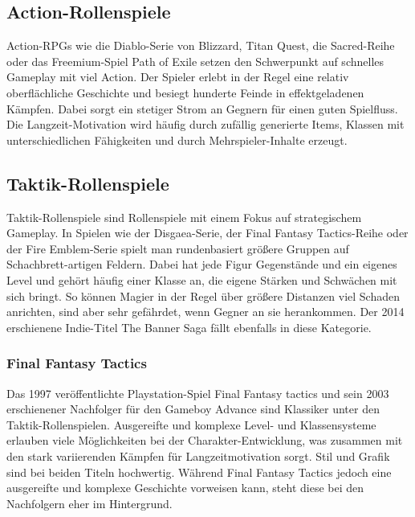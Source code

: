 \documentclass[extern,palatino]{cgBA}
\begin{document}
	\subsection{Action-Rollenspiele}
	Action-RPGs wie die Diablo-Serie von Blizzard, Titan Quest, die Sacred-Reihe oder das Freemium-Spiel Path of Exile setzen den Schwerpunkt auf schnelles Gameplay mit viel Action. Der Spieler erlebt in der Regel eine relativ oberflächliche Geschichte und besiegt hunderte Feinde in effektgeladenen Kämpfen. Dabei sorgt ein stetiger Strom an Gegnern für einen guten Spielfluss. Die Langzeit-Motivation wird häufig durch zufällig generierte Items, Klassen mit unterschiedlichen Fähigkeiten und durch Mehrspieler-Inhalte erzeugt.
	\subsection{Taktik-Rollenspiele}
	Taktik-Rollenspiele sind Rollenspiele mit einem Fokus auf strategischem Gameplay. In Spielen wie der Disgaea-Serie, der Final Fantasy Tactics-Reihe oder der Fire Emblem-Serie spielt man rundenbasiert größere Gruppen auf Schachbrett-artigen Feldern. Dabei hat jede Figur Gegenstände und ein eigenes Level und gehört häufig einer Klasse an, die eigene Stärken und Schwächen mit sich bringt. So können Magier in der Regel über größere Distanzen viel Schaden anrichten, sind aber sehr gefährdet, wenn Gegner an sie herankommen. Der 2014 erschienene Indie-Titel The Banner Saga fällt ebenfalls in diese Kategorie.
	\subsubsection{Final Fantasy Tactics}
	Das 1997 veröffentlichte Playstation-Spiel Final Fantasy tactics und sein 2003 erschienener Nachfolger für den Gameboy Advance sind Klassiker unter den Taktik-Rollenspielen. Ausgereifte und komplexe Level- und Klassensysteme erlauben viele Möglichkeiten bei der Charakter-Entwicklung, was zusammen mit den stark variierenden Kämpfen für Langzeitmotivation sorgt. Stil und Grafik sind bei beiden Titeln hochwertig. Während Final Fantasy Tactics jedoch eine ausgereifte und komplexe Geschichte vorweisen kann, steht diese bei den Nachfolgern eher im Hintergrund.
\end{document}
